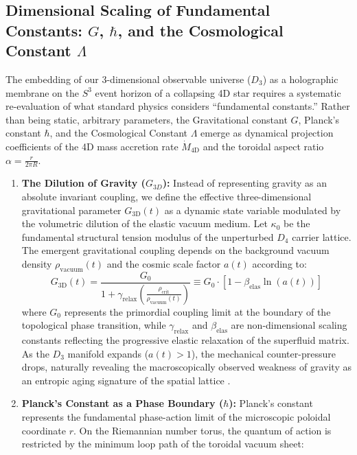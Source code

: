 \documentclass[11pt,a4paper]{article}
\theoremstyle{plain}
\theoremstyle{definition}
\theoremstyle{remark}
\begin{document}
\subsection{Dimensional Scaling of Fundamental Constants: $G$, $\hbar$, and the Cosmological Constant $\Lambda$} 
The embedding of our 3-dimensional observable universe ($D_3$) as a holographic membrane on the $S^3$ event horizon of a collapsing 4D star requires a systematic re-evaluation of what standard physics considers ``fundamental constants.'' Rather than being static, arbitrary parameters, the Gravitational constant $G$, Planck's constant $\hbar$, and the Cosmological Constant $\Lambda$ emerge as dynamical projection coefficients of the 4D mass accretion rate $\dot{M}_{\text{4D}}$ and the toroidal aspect ratio $\alpha = \frac{r}{2\pi R}$.

\begin{enumerate} 
\item \textbf{The Dilution of Gravity ($G_{3D}$):} 
    Instead of representing gravity as an absolute invariant coupling, we define the effective three-dimensional gravitational parameter $G_{\text{3D}}(t)$ as a dynamic state variable modulated by the volumetric dilution of the elastic vacuum medium. Let $\kappa_0$ be the fundamental structural tension modulus of the unperturbed $D_4$ carrier lattice. The emergent gravitational coupling depends on the background vacuum density $\rho_{\text{vacuum}}(t)$ and the cosmic scale factor $a(t)$ according to:
    \begin{equation}
    G_{\text{3D}}(t) = \frac{G_0}{1 + \gamma_{\text{relax}} \left(\frac{\rho_{\text{crit}}}{\rho_{\text{vacuum}}(t)}\right)} \equiv G_0 \cdot \left[ 1 - \beta_{\text{elas}} \ln\left(a(t)\right) \right]
    \end{equation}
    where $G_0$ represents the primordial coupling limit at the boundary of the topological phase transition, while $\gamma_{\text{relax}}$ and $\beta_{\text{elas}}$ are non-dimensional scaling constants reflecting the progressive elastic relaxation of the superfluid matrix. As the $D_3$ manifold expands ($a(t) > 1$), the mechanical counter-pressure drops, naturally revealing the macroscopically observed weakness of gravity as an entropic aging signature of the spatial lattice \cite{verlinde2011}.    \item \textbf{Planck's Constant as a Phase Boundary ($\hbar$):} Planck's constant represents the fundamental phase-action limit of the microscopic poloidal coordinate $r$. On the Riemannian number torus, the quantum of action is restricted by the minimum loop path of the toroidal vacuum sheet: 

\end{enumerate}
\end{document}
